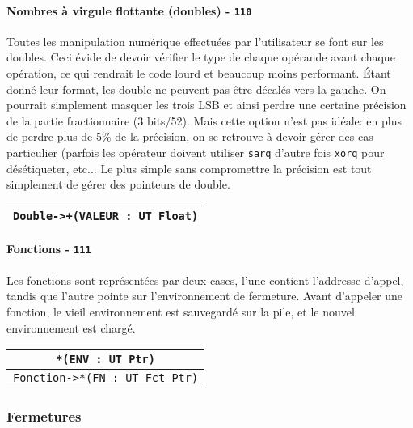 \documentclass{article}
\begin{document}
\paragraph{Nombres à virgule flottante (doubles) - \texttt{110}}
\label{par:doubles}
Toutes les manipulation numérique effectuées par l'utilisateur se font sur les doubles. Ceci évide de devoir vérifier le type de chaque opérande avant chaque opération, ce qui rendrait le code lourd et beaucoup moins performant. Étant donné leur format, les double ne peuvent pas être décalés vers la gauche. On pourrait simplement masquer les trois LSB et ainsi perdre une certaine précision de la partie fractionnaire (3 bits/52). Mais cette option n'est pas idéale: en plus de perdre plus de 5\%{} de la précision, on se retrouve à devoir gérer des cas particulier (parfois les opérateur doivent utiliser \texttt{sarq} d'autre fois \texttt{xorq} pour désétiqueter, etc... Le plus simple sans compromettre la précision est tout simplement de gérer des pointeurs de double.

\begin{center}
\begin{tabular}{|c|}
    \hline
    \texttt{Double->+(VALEUR : UT Float)}\\
    \hline
\end{tabular}
\end{center}

\paragraph{Fonctions - \texttt{111}}
Les fonctions sont représentées par deux cases, l'une contient l'addresse d'appel, tandis que l'autre pointe sur l'environnement de fermeture. Avant d'appeler une fonction, le vieil environnement est sauvegardé sur la pile, et le nouvel environnement est chargé.

\begin{center}
\begin{tabular}{|c|}
    \hline
    \texttt{*(ENV : UT Ptr)}\\
    \hline
    \texttt{Fonction->*(FN : UT Fct Ptr)}\\
    \hline
\end{tabular}
\end{center}

\subsubsection{Fermetures}
\end{document}
